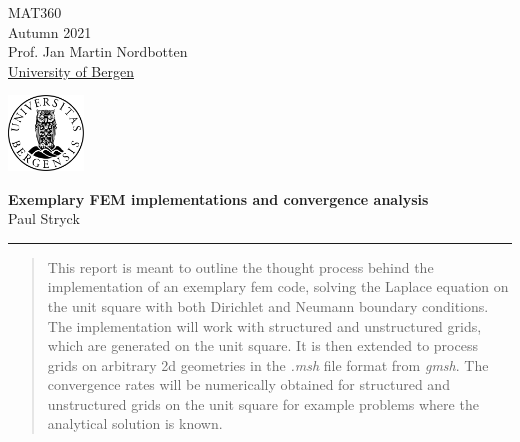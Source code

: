 \documentclass[11pt,a4paper]{article}
\begin{document}
\usetikzlibrary{positioning}

\pagestyle{plain}

\begin{multicols}{2}
  \begin{flushleft}
    MAT360 \\
    Autumn 2021\\
    Prof. Jan Martin Nordbotten\\
    \underline{University of Bergen}
  \end{flushleft}
  \vfill\null
  \columnbreak

  \begin{flushright}
    \includegraphics[height=2cm]{assets/uib.logo.png}
  \end{flushright}
\end{multicols}

\begin{center}
\textbf{\large Exemplary FEM implementations and convergence analysis}\\
Paul Stryck\\
\end{center}
\rule{\linewidth}{0.1mm}



\begin{abstract}
    \noindent
    This report is meant to outline the thought process behind the implementation of an exemplary fem code,
    solving the Laplace equation on the unit square with both Dirichlet and Neumann boundary conditions.
    The implementation will work with structured and unstructured grids, which are generated on the unit square.
    It is then extended to process grids on arbitrary 2d geometries in the {\it .msh} file format from {\it gmsh}.
    The convergence rates will be numerically obtained for structured and unstructured grids on the unit square
    for example problems where the analytical solution is known.
\end{abstract}
\end{document}
